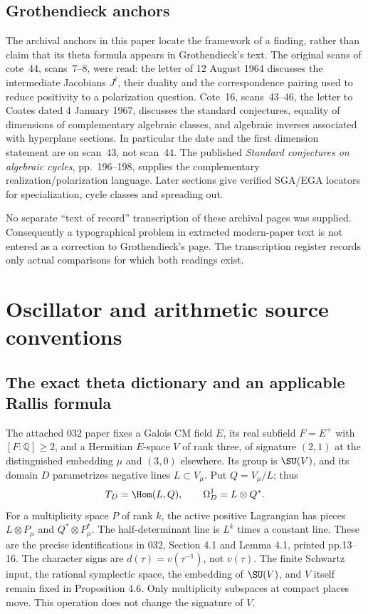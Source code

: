 \documentclass[11pt]{article}
\newcommand{\Q}{\mathbb Q}\newcommand{\C}{\mathbb C}\newcommand{\Z}{\mathbb Z}\newcommand{\R}{\mathbb R}\newcommand{\A}{\mathbb A}\newcommand{\OO}{\mathcal O}
\theoremstyle{definition}\newtheorem{definition}[theorem]{Definition}\newtheorem{remark}[theorem]{Remark}
\begin{document}
\subsection{Grothendieck anchors}
The archival anchors in this paper locate the framework of a finding, rather than claim that its theta formula appears in Grothendieck's text. The original scans of cote~44, scans~7--8, were read: the letter of 12 August 1964 discusses the intermediate Jacobians $J^i$, their duality and the correspondence pairing used to reduce positivity to a polarization question. Cote~16, scans~43--46, the letter to Coates dated 4 January 1967, discusses the standard conjectures, equality of dimensions of complementary algebraic classes, and algebraic inverses associated with hyperplane sections. In particular the date and the first dimension statement are on scan~43, not scan~44. The published \emph{Standard conjectures on algebraic cycles}, pp.~196--198, supplies the complementary realization/polarization language. Later sections give verified SGA/EGA locators for specialization, cycle classes and spreading out.

No separate ``text of record'' transcription of these archival pages was supplied. Consequently a typographical problem in extracted modern-paper text is not entered as a correction to Grothendieck's page. The transcription register records only actual comparisons for which both readings exist.


\section{Oscillator and arithmetic source conventions}


\subsection{The exact theta dictionary and an applicable Rallis formula}

The attached 032 paper fixes a Galois CM field $E$, its real subfield
$F=E^+$ with $[F:\Q]\geq2$, and a Hermitian $E$-space $V$ of rank three,
of signature $(2,1)$ at the distinguished embedding $\mu$ and $(3,0)$
elsewhere. Its group is $\SU(V)$, and its domain $D$ parametrizes negative
lines $L\subset V_\mu$. Put $Q=V_\mu/L$; thus
\[
 T_D=\Hom(L,Q),\qquad \Omega_D^1=L\otimes Q^*.
\]
For a multiplicity space $P$ of rank $k$, the active positive Lagrangian
has pieces $L\otimes P_\mu$ and $Q^*\otimes P_\mu^*$. The half-determinant
line is $L^k$ times a constant line. These are the precise identifications
in 032, Section 4.1 and Lemma 4.1, printed pp.13--16. The character signs
are $d(\tau)=v(\tau^{-1})$, not $v(\tau)$. The finite Schwartz input, the
rational symplectic space, the embedding of $\SU(V)$, and $V$ itself remain
fixed in Proposition 4.6. Only multiplicity subspaces at compact places
move. This operation does not change the signature of $V$.
\end{document}
